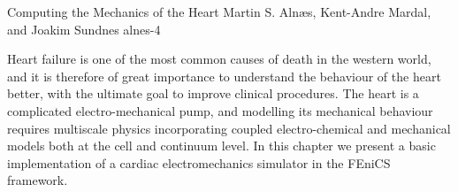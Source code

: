              {Computing the Mechanics of the Heart}
              {Martin S. Aln\ae{}s, Kent-Andre Mardal, and Joakim Sundnes}
              {alnes-4}

Heart failure is one of the most common causes of death in the western
world, and it is therefore of great importance to understand the
behaviour of the heart better, with the ultimate goal to improve
clinical procedures. The heart is a complicated electro-mechanical
pump, and modelling its mechanical behaviour requires multiscale
physics incorporating coupled electro-chemical and mechanical models
both at the cell and continuum level.  In this chapter we present a
basic implementation of a cardiac electromechanics simulator in the
FEniCS framework.
